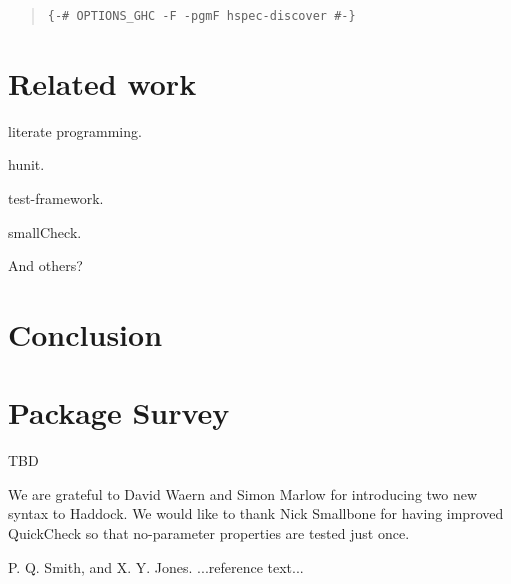 \documentclass[preprint]{sigplanconf}
\begin{document}
\begin{quote}
\small
\begin{verbatim}
{-# OPTIONS_GHC -F -pgmF hspec-discover #-}
\end{verbatim}
\end{quote}

\section{Related work}

literate programming.

hunit.

test-framework.

smallCheck.

And others?

\section{Conclusion}

\appendix

\section{Package Survey}

TBD

\acks

We are grateful to David Waern and Simon Marlow
for introducing two new syntax to Haddock.
We would like to thank
Nick Smallbone for having improved QuickCheck so that no-parameter properties are tested just once.






\begin{thebibliography}{}
\softraggedright

P. Q. Smith, and X. Y. Jones. ...reference text...

\end{thebibliography}
\end{document}
